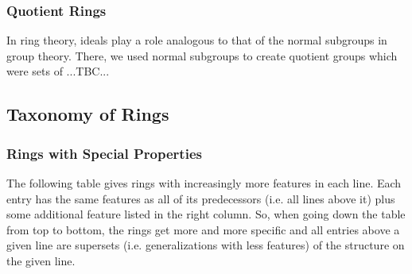 \subsubsection{Quotient Rings}
In ring theory, ideals play a role analogous to that of the normal subgroups in group theory. There, we used normal subgroups to create quotient groups which were sets of ...TBC...









\subsection{Taxonomy of Rings}

\subsubsection{Rings with Special Properties}
The following table gives rings with increasingly more features in each line. Each entry has the same features as all of its predecessors (i.e. all lines above it) plus some additional feature listed in the right column. So, when going down the table from top to bottom, the rings get more and more specific and all entries above a given line are supersets (i.e. generalizations with less features) of the structure on the given line.

